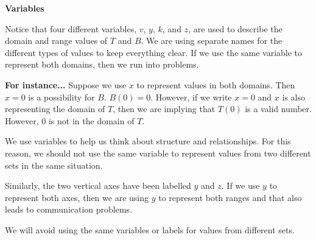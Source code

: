\documentclass{ximera}
\begin{document}
\begin{warning} \textbf{\textcolor{red!70!black}{Variables}} 

Notice that four different variables, $v$, $y$, $k$, and $z$, are used to describe the domain and range values of $T$ and $B$.  We are using separate names for the different types of values to keep everything clear. If we use the same variable to represent both domains, then we run into problems.




\textcolor{blue!55!black}{
\textbf{For instance...} Suppose we use $x$ to represent values in both domains.  Then $x = 0$ is a possibility for $B$.  $B(0) = 0$.  However, if we write $x = 0$ and $x$ is also representing the domain of $T$, then we are implying that $T(0)$ is a valid number.  However, $0$ is not in the domain of $T$.
}


We use variables to help us think about structure and relationships.  For this reason, we should not use the same variable to represent values from two different sets in the same situation.


Similarly, the two vertical axes have been labelled $y$ and $z$.  If we use $y$ to represent both axes, then we are using $y$ to represent both ranges and that also leads to communication problems.

We will avoid using the same variables or labels for values from different sets.

\end{warning}
\end{document}
